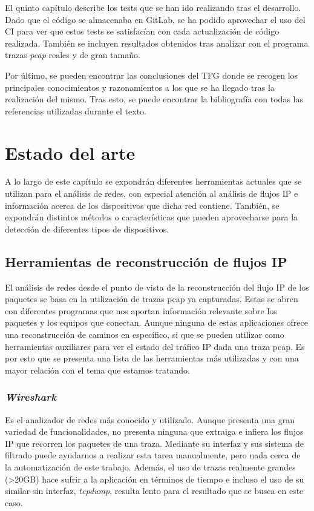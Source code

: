 \documentclass[twoside, 12pt]{epstfg}
\begin{document}
El quinto capítulo describe los tests que se han ido realizando tras el desarrollo. Dado que el código se almacenaba en GitLab, se ha podido aprovechar el uso del CI para ver que estos tests se satisfacían con cada actualización de código realizada. También se incluyen resultados obtenidos tras analizar con el programa trazas \textit{pcap} reales y de gran tamaño.

Por último, se pueden encontrar las conclusiones del TFG donde se recogen los principales conocimientos y razonamientos a los que se ha llegado tras la realización del mismo. Tras esto, se puede encontrar la bibliografía con todas las referencias utilizadas durante el texto.

\chapter{Estado del arte}
A lo largo de este capítulo se expondrán diferentes herramientas actuales que se utilizan para el análisis de redes, con especial atención al análisis de flujos IP e información acerca de los dispositivos que dicha red contiene. También, se expondrán distintos métodos o características que pueden aprovecharse para la detección de diferentes tipos de dispositivos.

\section{Herramientas de reconstrucción de flujos IP}
El análisis de redes desde el punto de vista de la reconstrucción del flujo IP de los paquetes se basa en la utilización de trazas pcap ya capturadas. Estas se abren con diferentes programas que nos aportan información relevante sobre los paquetes y los equipos que conectan. Aunque ninguna de estas aplicaciones ofrece una reconstrucción de caminos en específico, si que se pueden utilizar como herramientas auxiliares para ver el estado del tráfico IP dada una traza pcap. Es por esto que se presenta una lista de las herramientas más utilizadas \cite{Gandhi2014} y con una mayor relación con el tema que estamos tratando.

\subsection{\textit{Wireshark}}
Es el analizador de redes más conocido y utilizado. Aunque presenta una gran variedad de funcionalidades, no presenta ninguna que extraiga e infiera los flujos IP que recorren los paquetes de una traza. Mediante su interfaz y sus sistema de filtrado puede ayudarnos a realizar esta tarea manualmente, pero nada cerca de la automatización de este trabajo. Además, el uso de trazas realmente grandes (>20GB) hace sufrir a la aplicación en términos de tiempo e incluso el uso de su similar sin interfaz, \textit{tcpdump}, resulta lento para el resultado que se busca en este caso.
\end{document}
